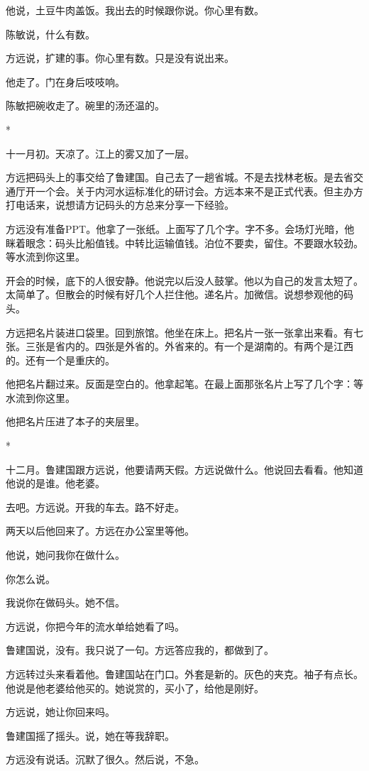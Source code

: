 \documentclass[UTF8,a5paper,11pt,openany]{ctexbook}
\newcommand{\scene}{\vspace{1em}\begin{center}*\quad*\quad*\end{center}\vspace{0.5em}}
\begin{document}
他说，土豆牛肉盖饭。我出去的时候跟你说。你心里有数。

陈敏说，什么有数。

方远说，扩建的事。你心里有数。只是没有说出来。

他走了。门在身后吱吱响。

陈敏把碗收走了。碗里的汤还温的。


\scene

十一月初。天凉了。江上的雾又加了一层。

方远把码头上的事交给了鲁建国。自己去了一趟省城。不是去找林老板。是去省交通厅开一个会。关于内河水运标准化的研讨会。方远本来不是正式代表。但主办方打电话来，说想请方记码头的方总来分享一下经验。

方远没有准备PPT。他拿了一张纸。上面写了几个字。字不多。会场灯光暗，他眯着眼念：码头比船值钱。中转比运输值钱。泊位不要卖，留住。不要跟水较劲。等水流到你这里。

开会的时候，底下的人很安静。他说完以后没人鼓掌。他以为自己的发言太短了。太简单了。但散会的时候有好几个人拦住他。递名片。加微信。说想参观他的码头。

方远把名片装进口袋里。回到旅馆。他坐在床上。把名片一张一张拿出来看。有七张。三张是省内的。四张是外省的。外省来的。有一个是湖南的。有两个是江西的。还有一个是重庆的。

他把名片翻过来。反面是空白的。他拿起笔。在最上面那张名片上写了几个字：等水流到你这里。

他把名片压进了本子的夹层里。


\scene

十二月。鲁建国跟方远说，他要请两天假。方远说做什么。他说回去看看。他知道他说的是谁。他老婆。

去吧。方远说。开我的车去。路不好走。

两天以后他回来了。方远在办公室里等他。

他说，她问我你在做什么。

你怎么说。

我说你在做码头。她不信。

方远说，你把今年的流水单给她看了吗。

鲁建国说，没有。我只说了一句。方远答应我的，都做到了。

方远转过头来看着他。鲁建国站在门口。外套是新的。灰色的夹克。袖子有点长。他说是他老婆给他买的。她说赏的，买小了，给他是刚好。

方远说，她让你回来吗。

鲁建国摇了摇头。说，她在等我辞职。

方远没有说话。沉默了很久。然后说，不急。
\end{document}
